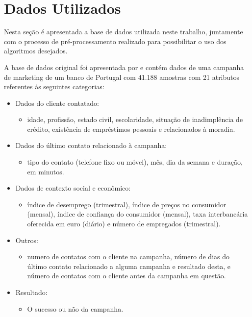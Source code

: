  \section{Dados Utilizados}
	Nesta seção é apresentada a base de dados utilizada neste trabalho, juntamente com o processo de pré-processamento realizado para possibilitar o uso dos algoritmos desejados.
    
    A base de dados original foi apresentada por \cite{bank_dataset} e contém dados de uma campanha de marketing de um banco de Portugal com 41.188 amostras com 21 atributos referentes às seguintes categorias:
\begin{itemize}
  \item Dados do cliente contatado:
      \begin{itemize}
          \item idade, profissão, estado civil, escolaridade, situação de inadimplência de crédito, existência de empréstimos pessoais e relacionados à moradia.
      \end{itemize}
  \item Dados do último contato relacionado à campanha: 
      \begin{itemize} 
          \item tipo do contato (telefone fixo ou móvel), mês, dia da semana e duração, em minutos. 
      \end{itemize}
  \item Dados de contexto social e econômico:
      \begin{itemize}
          \item  índice de desemprego (trimestral), índice de preços no consumidor (mensal), índice de confiança do consumidor (mensal), taxa interbancária oferecida em euro (diário) e número de empregados (trimestral).
      \end{itemize}
  \item  Outros:
      \begin{itemize} 
          \item numero de contatos com o cliente na campanha, número de dias do último contato relacionado a alguma campanha e resultado desta, e número de contatos com o cliente antes da campanha em questão. 
      \end{itemize}
     \item  Resultado:
      \begin{itemize} 
          \item O sucesso ou não da campanha.
      \end{itemize}
\end{itemize} 


